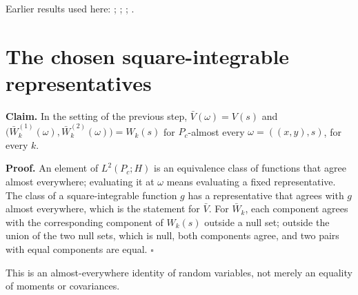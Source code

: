 \documentclass[11pt,a4paper]{article}
\begin{document}
Earlier results used here: \cite[Section~3.17.1]{LangevinLean2026ULASC}; \cite[Section~3.22.2]{LangevinLean2026ULASC}; \cite[Section~3.22.3]{LangevinLean2026ULASC}; \cite[Section~3.23.5]{LangevinLean2026ULASC}.

\section{\texorpdfstring{The chosen square-integrable representatives}{The chosen square-integrable representatives}}


\textbf{Claim.} In the setting of the previous step, \(\bar V(\omega)=V(s)\) and \(\bigl(\bar W_k^{(1)}(\omega),\bar W_k^{(2)}(\omega)\bigr)=W_k(s)\) for \(P_c\)-almost every \(\omega=((x,y),s)\), for every \(k\).




\textbf{Proof.} An element of \(L^2(P_c;H)\) is an equivalence class of functions that agree almost everywhere; evaluating it at \(\omega\) means evaluating a fixed representative. The class of a square-integrable function \(g\) has a representative that agrees with \(g\) almost everywhere, which is the statement for \(\bar V\). For \(\bar W_k\), each component agrees with the corresponding component of \(W_k(s)\) outside a null set; outside the union of the two null sets, which is null, both components agree, and two pairs with equal components are equal. \(\square\)




This is an almost-everywhere identity of random variables, not merely an equality of moments or covariances.
\end{document}
